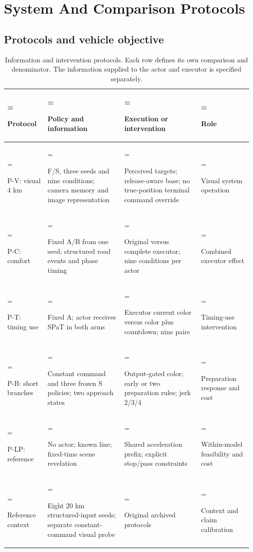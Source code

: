 \documentclass[letterpaper,journal]{IEEEtran}
\begin{document}
\section{System And Comparison Protocols}

\subsection{Protocols and vehicle objective}

\begin{table}[!t]
\centering
\renewcommand{\thetable}{I}
\caption{Information and intervention protocols. Each row defines its own comparison and denominator. The information supplied to the actor and executor is specified separately.}
\setlength{\tabcolsep}{3pt}
\renewcommand{\arraystretch}{1.12}
\begin{tabularx}{\textwidth}{@{}>{\hsize=0.680000\hsize\linewidth=\hsize\raggedright\arraybackslash}X>{\hsize=1.280000\hsize\linewidth=\hsize\raggedright\arraybackslash}X>{\hsize=1.320000\hsize\linewidth=\hsize\raggedright\arraybackslash}X>{\hsize=0.720000\hsize\linewidth=\hsize\raggedright\arraybackslash}X@{}}
\toprule
\textbf{Protocol} & \textbf{Policy and information} & \textbf{Execution or intervention} & \textbf{Role} \\
\midrule
P-V: visual 4 km & F/S, three seeds and nine conditions; camera memory and image representation & Perceived targets; release-aware base; no true-position terminal command override & Visual system operation \\
P-C: comfort & Fixed A/B from one seed; structured road events and phase timing & Original versus complete executor; nine conditions per actor & Combined executor effect \\
P-T: timing use & Fixed A; actor receives SPaT in both arms & Executor current color versus color plus countdown; nine pairs & Timing-use intervention \\
P-B: short branches & Constant command and three frozen S policies; two approach states & Output-gated color; early or two preparation rules; jerk 2/3/4 & Preparation response and cost \\
P-LP: reference & No actor; known line; fixed-time scene revelation & Shared acceleration prefix; explicit stop/pass constraints & Within-model feasibility and cost \\
Reference context & Eight 20 km structured-input seeds; separate constant-command visual probe & Original archived protocols & Context and claim calibration \\
\bottomrule\end{tabularx}
\end{table}
\end{document}
